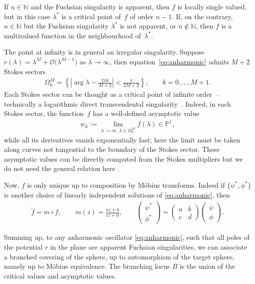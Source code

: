\documentclass[pdftex]{sigma}
\numberwithin{equation}{section}
\newcommand{\bb}[1]{\mathbb{ #1 }}
\newcommand{\la}{\lambda}
\begin{document}
If $n\in \bb{N}$ and the Fuchsian singularity is apparent, then $f$ is locally single valued, but in this case $\la^*$ is a critical point of~$f$ of order $n-1$. If, on the contrary, $n \in \bb{N}$ but the Fuchsian singularity $\la^*$ is not apparent, or $n \notin \bb{N}$, then $f$ is a multivalued function in the neighbourhood of~$\la^*$.

The point at inf\/inity is in general an irregular singularity. Suppose $r(\la)=\la^M+ \mathcal{O}\big(\la^{M-1}\big)$ as $\la \to \infty$, then equation~\eqref{eq:anharmonic} admits $M+2$ Stokes sectors
\begin{gather*}
 \Omega_k^M=\left\lbrace \left| \arg\lambda - \frac{2 \pi k}{M+2} \right| < \frac{\pi}{2M+2} \right\rbrace , \qquad k=0,\dots,M+1 .
\end{gather*}
Each Stokes sector can be thought as a critical point of inf\/inite order~-- technically a logarithmic direct transcendental singularity~\cite{eremenko2004}. Indeed, in each Stokes sector, the function~$f$ has a well-def\/ined asymptotic value
\begin{gather*}
w_k:=\lim_{\lambda\rightarrow \infty,\, \lambda\in \Omega_k^M}{f(\lambda)}\in \mathbb{P}^1,
\end{gather*}
while all its derivatives vanish exponentially fast; here the limit must be taken along curves not tangential to the boundary of the Stokes sector. These asymptotic values can be directly computed from the Stokes multipliers but we do not need the general relation here \cite{masoerobethe,nevanlinna32}.

Now, $f$ is only unique up to composition by M\"obius transforms. Indeed if $\{\psi^*,\phi^*\}$ is another choice of linearly independent solutions of \eqref{eq:anharmonic}, then
\begin{gather}\label{eq:mobius}
\widetilde{f}=m\circ f,\qquad m(z)=\frac{az+b}{cz+d},\qquad \begin{pmatrix}\psi^*\\\phi^*
\end{pmatrix}=\begin{pmatrix}
a & b\\
c & d
\end{pmatrix}\begin{pmatrix}
\psi\\
\phi
\end{pmatrix}.
\end{gather}

Summing up, to any anharmonic oscillator \eqref{eq:anharmonic}, such that all poles of the potential $r$ in the plane are apparent Fuchsian singularities,
we can associate a branched covering of the sphere, up to automorphism of the target sphere, namely up to M\"obius equivalence. The branching locus $B$ is the union of the critical values and asymptotic values.
\end{document}
